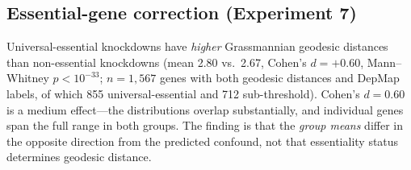 \documentclass[11pt]{article}
\begin{document}
%

\subsection{Essential-gene correction (Experiment 7)}

Universal-essential knockdowns have \emph{higher} Grassmannian geodesic
distances than non-essential knockdowns (mean 2.80 vs.\ 2.67, Cohen's $d =
+0.60$, Mann--Whitney $p < 10^{-33}$; $n = 1{,}567$ genes with both
geodesic distances and DepMap labels, of which 855 universal-essential and
712 sub-threshold). Cohen's $d = 0.60$ is a medium effect---the
distributions overlap substantially, and individual genes span the full
range in both groups. The finding is that the \emph{group means} differ
in the opposite direction from the predicted confound, not that essentiality
status determines geodesic distance.
\end{document}
